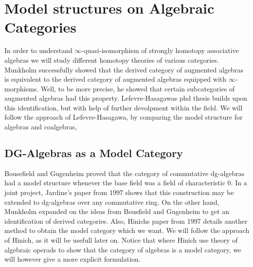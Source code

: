 \documentclass[../thesis.tex]{subfiles}
\begin{document}
    \section{Model structures on Algebraic Categories}

            In order to understand $\infty$-quasi-isomorphism of strongly homotopy associative algebras we will study different homotopy theories of various categories. Munkholm \cite{Munkholm78} successfully showed that the derived category of  augmented algebras is equivalent to the derived category of augmented algebras equipped with $\infty$-morphisms. Well, to be more precise, he showed that certain subcategories of augmented algebras had this property. Lefevre-Hasagawas phd thesis \cite{LefevreHasegawa03} builds upon this identification, but with help of further devolpment within the field. We will follow the approach of Lefevre-Hasagawa, by comparing the model structure for algebras and coalgebras,

        \subsection{DG-Algebras as a Model Category}

            Bousefield and Gugenheim \cite{Bousfield76} proved that the category of commutative dg-algebras had a model structure whenever the base field was a field of characteristic $0$. In a joint project, Jardine's paper from 1997 \cite{Jardine97} shows that this construction may be extended to dg-algebras over any commutative ring. On the other hand, Munkholm expanded on the ideas from Bousfield and Gugenheim to get an identification of derived categories. Also, Hinichs paper from 1997 \cite{Hinich97} details another method to obtain the model category which we want. We will follow the approach of Hinich, as it will be usefull later on. Notice that where Hinich use theory of algebraic operads to show that the category of algebras is a model category, we will however give a more explicit formulation.
\end{document}
